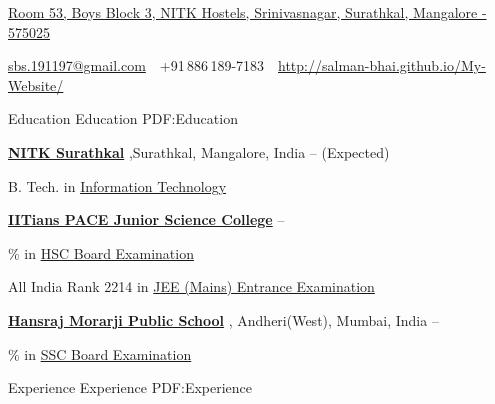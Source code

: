 \documentclass[letterpaper,MMMyyyy,nonstopmode]{simpleresumecv}
\newcommand{\CVAuthor}{Salman Shah}
\newcommand{\CVWebpage}{http://salman-bhai.github.io/My-Website/}
\begin{document}

\Title{\CVAuthor}

\begin{SubTitle}
\href{https://www.google.co.in/maps/search/3rd+Block,+National+Institute+of+Technology,+Dodda+Kopla,+Surathkal,+Karnataka+575025/@13.0125878,74.798059,15z/data=!3m1!4b1}
{Room 53, Boys Block 3, NITK Hostels, Srinivasnagar, Surathkal, Mangalore - 575025}
\par
\href{mailto:sbs.191197@gmail.com}
{sbs.191197@gmail.com}
\,\SubBulletSymbol\,
+91\,886\,189-7183
\,\SubBulletSymbol\,
\textcolor{blue}{\href{\CVWebpage}
{\url{\CVWebpage}}}
\end{SubTitle}

\begin{Body}


\Section
{Education}
{Education}
{PDF:Education}

\Entry
\textcolor{blue}{
\href{http://nitk.ac.in/}
{\textbf{NITK Surathkal}}
}
,Surathkal, Mangalore, India
\hfill
{} --
(Expected)

\Gap
\BulletItem
B. Tech. in 
\textcolor{blue}{
\href{http://infotech.nitk.ac.in/}
{Information Technology}
}
\Gap

\Entry
\textcolor{blue}{
\href{http://www.iitianspace.com/}
{\textbf{IITians PACE Junior Science College}}
}
\hfill
{} --
\Gap

\% in 
\href{https://drive.google.com/open?id=0BxuVe1f_hNs2TDA4em5UUE9jdDQ}
{HSC Board Examination}
\Gap

\BulletItem
All India Rank 2214 in 
\href{http://www.example.com/my-department}
{JEE (Mains) Entrance Examination}
\Gap

\Entry
\textcolor{blue}{
\href{http://www.hansrajeducation.org/}
{\textbf{Hansraj Morarji Public School}}}
, Andheri(West), Mumbai, India
\hfill
{} --

\Gap
{}\% in
\href{https://drive.google.com/file/d/0BxuVe1f_hNs2QXVwX2F2V0VXTEE/view?usp=sharing}
{SSC Board Examination}
\begin{Detail}
\end{Detail}


\Section
{Experience}
{Experience}
{PDF:Experience}


\end{Body}
\end{document}
